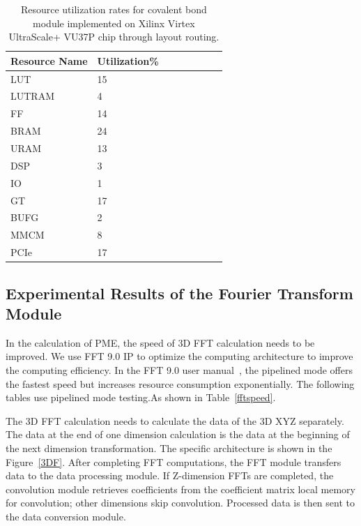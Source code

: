 \documentclass{article}
\begin{document}
\begin{table}[!ht]
	\centering
		\caption[Resource utilization of RTL covalent bond module]{Resource utilization rates for covalent bond module implemented on Xilinx Virtex UltraScale+ VU37P chip through layout routing.}
	\begin{tabular*}{\hsize}{@{}@{\extracolsep{\fill}}llllllll@{}}
		\toprule
		Resource Name & Utilization\% \\
		\midrule
		LUT & 15 \\
		LUTRAM & 4 \\
		FF & 14 \\
		BRAM & 24 \\
		URAM & 13 \\
		DSP & 3 \\
		IO & 1 \\
		GT & 17 \\
		BUFG & 2 \\
		MMCM & 8 \\
		PCIe & 17 \\
		\bottomrule
	\end{tabular*}
\label{bond}
\end{table}

\subsection{Experimental Results of the Fourier Transform Module}

In the calculation of PME, the speed of 3D FFT calculation needs to be improved.
We use FFT 9.0 IP to optimize the computing architecture to improve the computing efficiency.
In the FFT 9.0 user manual~\cite{8056853}, the pipelined mode offers 
the fastest speed but increases resource consumption exponentially. 
The following tables use pipelined mode testing.As shown in Table~\ref{fftspeed}. 


The 3D FFT calculation needs to calculate the data of the 3D XYZ separately. 
The data at the end of one dimension calculation is the data at the beginning of the next dimension transformation. The specific architecture is shown in the Figure~\ref{3DF}.
After completing FFT computations, the FFT module transfers data to the data 
processing module. 
If Z-dimension FFTs are completed, the convolution module retrieves 
coefficients from the coefficient matrix local memory for convolution; 
other dimensions skip convolution. 
Processed data is then sent to the data conversion module. 
\end{document}
